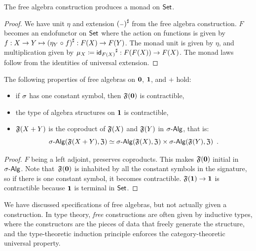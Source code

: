 \begin{toappendix}
    \begin{proposition}
        \label{prop:free-algebra-monad}
        The free algebra construction produces a monad on $\mathsf{Set}$.
    \end{proposition}
    \begin{proof}
        We have unit $\eta$ and extension $\ext{(\blank)}$ from the free algebra construction.
        $F$ becomes an endofunctor on $\mathsf{Set}$ where the action on functions is given by
        $f : X \to Y \mapsto {(\eta_{Y} \mathrel{\circ}f)}^{\sharp} : F(X) \to F(Y)$.
        The monad unit is given by $\eta$,
        and multiplication given by $\mu_{X} \mathrel{\coloneq} {\operatorname{\mathsf{id}}_{F(X)}}^{\sharp} : F(F(X)) \to F(X)$.
        The monad laws follow from the identities of universal extension.
    \end{proof}

    \begin{proposition}
        \label{prop:free-algebra-colimits}
        The following properties of free algebras on ${\mathbf{0}}$, ${\mathbf{1}}$, and $+$ hold:
        \begin{itemize}
            \item if $\sigma$ has one constant symbol, then $\mathfrak{F}({\mathbf{0}})$ is contractible,
            \item the type of algebra structures on ${\mathbf{1}}$ is contractible,
            \item $\mathfrak{F}(X + Y)$ is the coproduct of $\mathfrak{F}(X)$ and $\mathfrak{F}(Y)$ in $\sigAlg$, that is:
                  \[
                      \sigAlg(\str{F}(X + Y), \str{Z}) \eqv \sigAlg(\str{F}(X), \str{Z}) \times \sigAlg(\str{F}(Y), \str{Z}) \enspace.
                  \]
        \end{itemize}
    \end{proposition}
    \begin{proof}
        $F$ being a left adjoint, preserves coproducts.
        This makes $\mathfrak{F}({\mathbf{0}})$ initial in $\sigAlg$.
        Note that~\(\mathfrak{F}({\mathbf{0}})\) is inhabited by all the constant symbols in the signature,
        so if there is one constant symbol, it becomes contractible.
        $\mathfrak{F}({\mathbf{1}}) \to {\mathbf{1}}$ is contractible because ${\mathbf{1}}$ is terminal in $\mathsf{Set}$.
    \end{proof}
\end{toappendix}
We have discussed specifications of free algebras, but not actually given a construction.
%
In type theory, \emph{free} constructions are often given by inductive types,
where the constructors are the pieces of data that freely generate the structure,
and the type-theoretic induction principle enforces the category-theoretic universal property.


